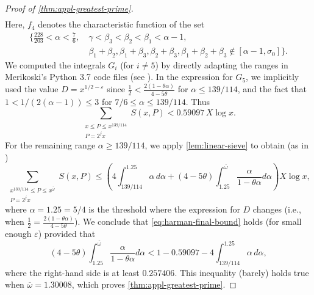 \documentclass[reqno,11pt]{amsart}
\theoremstyle{remark}
\numberwithin{equation}{section}
\newcommand{\eps}{\varepsilon}
\renewcommand{\bar}{\overline}
\begin{document}
\begin{proof}[Proof of \cref{thm:appl-greatest-prime}]
\[\begin{aligned}
\end{aligned}
\]
Here, $f_4$ denotes the characteristic function of the set
\[
\begin{aligned}
    \Big \{\frac{228}{203} < \alpha < \frac{7}{6},\ &\gamma < \beta_3 < \beta_2 < \beta_1 < \alpha-1,
    \\
    &\beta_1 + \beta_2, \beta_1 + \beta_3, \beta_2 + \beta_3, \beta_1 + \beta_2 + \beta_3 \not\in [\alpha-1, \sigma_0] \Big \}.
\end{aligned}
\]
We computed the integrals $G_i$ (for $i \neq 5$) by directly adapting the ranges in Merikoski's Python 3.7 code files (see \cite[p.\,1268]{merikoski2023largest}). In the expression for $G_5$, we implicitly used the value $D = x^{1/2-\eps}$ since $\frac{1}{2} < \frac{2(1-\theta\alpha)}{4-5\theta}$ for $\alpha \le 139/114$, and the fact that $1 < 1/(2(\alpha-1)) \le 3$ for $7/6 \le \alpha \le 139/114$. Thus
\[
    \sum_{\substack{x \le P \le x^{139/114} \\ P = 2^j x}} S(x, P)
    < 
    0.59097\, X \log x.
\]
For the remaining range $\alpha \ge 139/114$, we apply \cref{lem:linear-sieve} to obtain (as in \cite[(2.8)]{merikoski2023largest})
\[
    \sum_{\substack{x^{139/114} \le P \le x^{\bar{\omega}} \\ P = 2^j x}} 
    S(x, P) 
    \le
    \left(4 \int_{139/114}^{1.25} \alpha\, d\alpha + 
    (4-5\theta) \int_{1.25}^{\bar{\omega}} \frac{\alpha}{1-\theta\alpha} d\alpha \right) X \log x,
\]
where $\alpha = 1.25 = 5/4$ is the threshold where the expression for $D$ changes (i.e., when $\frac{1}{2} = \frac{2(1-\theta\alpha)}{4-5\theta}$). We conclude that \cref{eq:harman-final-bound} holds (for small enough $\eps$) provided that
\[
    (4-5\theta) \int_{1.25}^{\bar{\omega}} \frac{\alpha}{1-\theta\alpha} d\alpha 
    < 
    1 
    -
    0.59097
    -
    4 \int_{139/114}^{1.25} \alpha\, d\alpha,
\]
where the right-hand side is at least $0.257406$.
This inequality (barely) holds true when $\bar{\omega} = 1.30008$, which proves \cref{thm:appl-greatest-prime}.
\end{proof}








\end{document}
